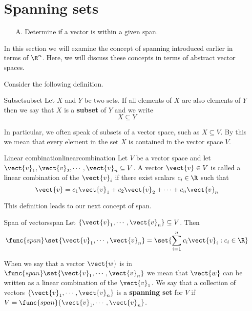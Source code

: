 \section{Spanning sets}

\begin{outcome}
\begin{enumerate}
\item[A.] Determine if a vector is within a given span.
\end{enumerate}
\end{outcome}

In this section we will examine the concept of spanning introduced earlier in terms of $\R^n$. Here, we will discuss these concepts in terms of abstract vector spaces. 

Consider the following definition. 

\begin{definition}{Subset}{subset}
Let $X$ and $Y$ be two sets. If all elements of $X$ are also elements of $Y$ then we say that $X$ is a \textbf{subset} of $Y$ and we write
\[
X \subseteq Y
\]
\end{definition}

In particular, we often speak of subsets of a vector space, such as $X \subseteq V$. By this we mean that every element in the set $X$ is contained in the vector space $V$. 

\begin{definition}{Linear combination}{linearcombination}
Let $V$ be a vector space and let $\vect{v}_1, \vect{v}_2, \cdots, \vect{v}_n \subseteq V$. A vector $\vect{v} \in V$ is called a linear combination of the $\vect{v}_i$ if there exist scalars $c_i \in \R$ such that 
\[
\vect{v} = c_1 \vect{v}_1 + c_2 \vect{v}_2 + \cdots + c_n \vect{v}_n
\]
\end{definition}

This definition leads to our next concept of span.

\begin{definition}{Span of vectors}{span}
Let $\{\vect{v}_{1},\cdots ,\vect{v}_{n}\} \subseteq V$. Then
\begin{equation*}
\func{span}\set{\vect{v}_{1},\cdots ,\vect{v}_{n}} = 
\set{\sum_{i=1}^{n}c_{i}\vect{v}_{i}: c_{i}\in \R
} 
\end{equation*}
\end{definition}

When we say that a vector $\vect{w}$ is in $\func{span}\set{\vect{v}_{1},\cdots ,\vect{v}_{n}}$ we mean that $\vect{w}$ can be written as a linear combination of the $\vect{v}_1$. We say that a collection of vectors $\{\vect{v}_{1},\cdots ,\vect{v}_{n}\}$ is a \textbf{spanning set} for $V$ if $V = \func{span} \{\vect{v}_{1},\cdots ,\vect{v}_{n}\}$. 

